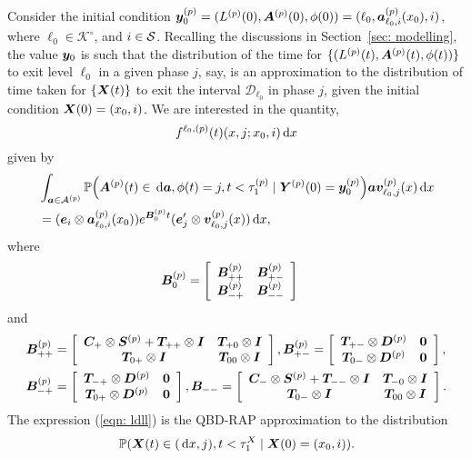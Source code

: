 Consider the initial condition \(\boldsymbol y_0^{(p)} = (L^{(p)}(0),\boldsymbol A^{(p)}(0),\phi(0))=(\ell_0,\boldsymbol a^{(p)}_{\ell_0,i}(x_0),i)\), where \(\ell_0\in\mathcal K^\circ\), and \(i\in\mathcal{S}\). Recalling the discussions in Section~\ref{sec: modelling}, the value \(\boldsymbol y_0\) is such that the distribution of the time for \(\{(L^{(p)}(t),\boldsymbol A^{(p)}(t),\phi(t))\}\) to exit level \(\ell_0\) in a given phase \(j\), say, is an approximation to the distribution of time taken for \(\{\boldsymbol X(t)\}\) to exit the interval \(\mathcal D_{\ell_0}\) in phase \(j\), given the initial condition \(\boldsymbol X(0)=(x_0,i)\). We are interested in the quantity, \[f^{\ell_0,(p)}(t)(x,j;x_0,i)\, \mathrm{d} x\] given by
\begin{align}
	&\int_{\boldsymbol a \in \mathcal A^{(p)}}\mathbb P\Big(\boldsymbol A^{(p)}(t)\in \, \mathrm{d} \boldsymbol a, \phi(t) = j , t<\tau_1^{(p)}\nonumber
	\mid \boldsymbol Y^{(p)}(0) = \boldsymbol y_0^{(p)}\Big)
	\boldsymbol a{\boldsymbol v}_{\ell_0,j}^{(p)}(x)\, \mathrm{d} x \nonumber 
	\\&= (\boldsymbol e_i\otimes \boldsymbol  a_{\ell_0,i}^{(p)}(x_0)) e^{\boldsymbol{B}_{0}^{(p)}t}(\boldsymbol e_j'{} \otimes {\boldsymbol v}_{\ell_0,j}^{(p)}( x))\, \mathrm{d} x, \label{eqn: ldll}
\end{align}
where 
\begin{align*}
	\boldsymbol B_0^{(p)} &= \left[\begin{array}{ccc} \boldsymbol B_{++}^{(p)} & \boldsymbol B_{+-}^{(p)} \\ \boldsymbol B_{-+}^{(p)} & \boldsymbol B_{--}^{(p)}\end{array}\right]
\end{align*}
and
\begin{align*}
	\boldsymbol{B}_{++}^{(p)}  &= \left[\begin{array}{cc} \boldsymbol{C}_+\otimes \boldsymbol{S}^{(p)}  + \boldsymbol{T}_{++}\otimes \boldsymbol{I} & \boldsymbol T_{+0}\otimes \boldsymbol I \\ \boldsymbol T_{0+}\otimes \boldsymbol I & \boldsymbol T_{00}\otimes \boldsymbol I\end{array}\right] ,
	\boldsymbol{B}_{+-}^{(p)}  = \left[\begin{array}{cc} \boldsymbol{T}_{+-}\otimes \boldsymbol{D}^{(p)}  & \boldsymbol 0 \\ \boldsymbol T_{0-}\otimes \boldsymbol D^{(p)}  & \boldsymbol 0 \end{array}\right],
	\\ \boldsymbol{B}_{-+}^{(p)}  &=  \left[\begin{array}{cc} \boldsymbol{T}_{-+}\otimes \boldsymbol{D}^{(p)}  & \boldsymbol 0 \\ \boldsymbol T_{0+}\otimes \boldsymbol D^{(p)}  & \boldsymbol 0 \end{array}\right] ,
	\boldsymbol{B}_{--}  = \left[\begin{array}{cc} \boldsymbol{C}_-\otimes \boldsymbol{S}^{(p)}  + \boldsymbol{T}_{--}\otimes \boldsymbol{I} & \boldsymbol T_{-0}\otimes \boldsymbol I \\ \boldsymbol T_{0-}\otimes \boldsymbol I & \boldsymbol T_{00}\otimes \boldsymbol I\end{array}\right].
\end{align*}
The expression (\ref{eqn: ldll}) is the QBD-RAP approximation to the distribution 
\[\mathbb P(\boldsymbol X(t)\in (\, \mathrm{d} x,j), t<\tau_1^X \mid \boldsymbol X(0) = (x_0, i)).\]

